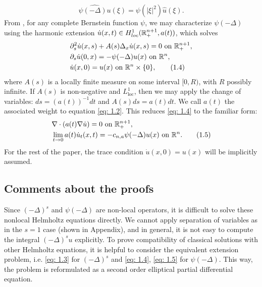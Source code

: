 \documentclass{article}
\begin{document}
$$
\widehat{\psi(-\Delta) u}(\xi) = \psi(|\xi|^2)\hat{u}(\xi).
$$
From \cite{kwas}, for any complete Bernstein function $\psi$, we may characterize $\psi(-\Delta)$ using the harmonic extension $\dot{u}(x,t) \in H^1_{loc}(\mathbb{R}^{n+1}_+, a(t))$, which solves  
 \begin{align*}
    & \partial_s ^2 \dot{u}(x,s) + A(s) \Delta_x \dot{u}(x,s) = 0 \textrm{ on } \mathbb{R}^{n+1}_{+}, \\
    & \partial_s \dot{u}(0,x) = -\psi(-\Delta) u(x) \textrm{ on } \mathbb{R}^n,\\
    &\dot{u} (x,0)= u(x)  \textrm{ on } \mathbb{R}^n \times \{0\},
    \tag{1.4} \label{eq: 1.4} 
\end{align*}
where $A(s)$ is a locally finite measure on some interval $[0, R)$,
with $R$ possibly infinite. If $A(s)$ is non-negative and $L^1_{\textrm{loc}}$, then we may apply the change of variables: $ds = (a(t))^{-1}dt$ and $A(s)ds = a(t)dt$. We call $a(t)$ the associated weight to equation \eqref{eq: 1.2}. This reduces \eqref{eq: 1.4} to the familiar form:
\begin{align*}
    & \nabla \cdot (a(t) \nabla \dot{u}) =  0 \textrm{ on } \mathbb{R}^{n+1}_{+}, \\
    & \lim_{t \to 0} a(t) \dot{u}_t(x,t) = -c_{n,a}\psi(-\Delta) u(x) \textrm{ on } \mathbb{R}^n. 
    \tag{1.5} \label{eq: 1.5}
\end{align*}
 For the rest of the paper, the trace condition $\dot{u} (x,0)= u(x)$ will be implicitly assumed.

\subsection{Comments about the proofs}

\indent

Since  $(-\Delta)^s$ and $\psi(-\Delta)$ are non-local operators,  it is difficult to solve these nonlocal Helmholtz equations directly. We cannot apply separation of variables as in the $s=1$ case (shown in Appendix), and in general, it is not easy to compute the integral $(-\Delta)^su$ explicitly. To prove compatibility of classical solutions with other Helmholtz equations, it is helpful to consider the equivalent extension problem, i.e. \eqref{eq: 1.3} for $(-\Delta)^s$ and \eqref{eq: 1.4}, \eqref{eq: 1.5} for $\psi(-\Delta)$. This way, the problem is reformulated as a second order elliptical partial differential equation.
\end{document}
